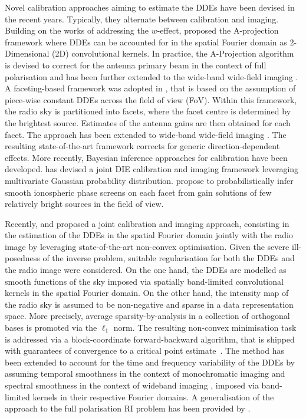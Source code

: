 \documentclass[fleqn,usenatbib]{mnras}
\begin{document}
Novel calibration approaches aiming to estimate the DDEs have been devised in the recent years. Typically, they alternate between calibration and imaging. Building on the works of \citet{Cornwell2005,Cornwell2008} addressing the $w$-effect, \citet{Bhatnagar2008} proposed the A-projection framework where DDEs can be accounted for in the spatial Fourier domain as 2-Dimensional (2D) convolutional kernels. In practice, the A-Projection algorithm is devised to correct for the antenna primary beam in the context of full polarisation and has been further extended to the wide-band wide-field imaging \citep{Bhatnagar2013}. 
A faceting-based framework was adopted in \citet{Tasse2014b, Smirnov2015, Weeren2016}, that is based on the assumption of piece-wise constant DDEs across the field of view (FoV). Within this framework, the radio sky is partitioned into facets, where the facet centre is determined by the brightest source. Estimates of the antenna gains are then obtained for each facet. The approach has been extended to wide-band wide-field imaging \citep{tasse2018}. The resulting state-of-the-art framework corrects for generic direction-dependent effects. More recently, {{Bayesian inference approaches for calibration have been developed. \citet{arras2019} has devised a joint DIE calibration and imaging framework leveraging multivariate Gaussian probability distribution.}} \citet{Albert20} propose to probabilistically infer smooth ionospheric phase screens on each facet from gain solutions of few relatively bright sources in the field of view.


Recently, \citet{Repetti2017} and \citet{Repetti20172} proposed a joint calibration and imaging approach, consisting in the estimation of the DDEs in the spatial Fourier domain jointly with the radio image by leveraging state-of-the-art non-convex optimisation. Given the severe ill-posedness of the inverse problem, suitable regularisation for both the DDEs and the radio image were considered. On the one hand, the DDEs are modelled as smooth functions of the sky imposed via spatially band-limited convolutional kernels in the spatial Fourier domain. On the other hand, {the intensity map of} the radio sky is assumed to be non-negative and sparse in a data representation space. More precisely, average sparsity-by-analysis in a collection of orthogonal bases is promoted via the $\ell_1$ norm. The resulting non-convex minimisation task is addressed via a block-coordinate forward-backward algorithm, that is shipped with {guarantees of convergence to a critical point estimate}~\citep{Chouzenoux2016}. The method has been extended to account for the time and frequency variability of the DDEs by assuming temporal smoothness \citep{Thouvenin2018} in the context of monochromatic imaging and spectral smoothness in the context of wideband imaging \citep{Dabbech2019}, imposed via band-limited kernels in their respective Fourier domains. A generalisation of the approach to the full polarisation RI problem has been provided by \citet{Birdi2019}.
\end{document}
